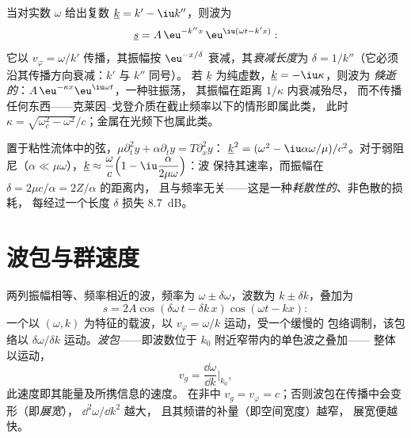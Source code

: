 \begin{definition}\label{def:b2:dispersion-wave-packets:complex}
当对实数 $\omega$ 给出复数
$\underline k = k' - \iu k''$，则波为
\[
\underline s = A\,\eu^{-k''x}\,\eu^{\iu(\omega t - k'x)} :
\]
它以 $v_\varphi = \omega/k'$ 传播，其振幅按
$\eu^{-x/\delta}$ 衰减，其\emph{衰减长度}为 $\delta = 1/k''$（它必须
沿其传播方向衰减：$k'$ 与 $k''$ 同号）。
若 $\underline k$ 为纯虚数，$\underline k = -\iu\kappa$，则波为
\emph{倏逝的}：$A\,\eu^{-\kappa x}\eu^{\iu\omega t}$，一种驻振荡，
其振幅在距离 $1/\kappa$ 内衰减殆尽，
而不传播任何东西——克莱因–戈登介质在截止频率以下的情形即属此类，
此时 $\kappa = \sqrt{\omega_c^2 - \omega^2}/c$；金属在光频下也属此类。
\end{definition}

\begin{example}[阻尼弦]\label{ex:b2:dispersion-wave-packets:damped}
置于粘性流体中的弦，$\mu\partial_t^2y + \alpha\partial_ty = T\partial_x^2y$：
$\underline k^2 = (\omega^2 - \iu\alpha\omega/\mu)/c^2$。对于弱阻尼（$\alpha \ll \mu
\omega$），$\underline k \approx \dfrac\omega c\Bigl(1 - \iu\dfrac{\alpha}{2\mu\omega}\Bigr)$：波
保持其速率，而振幅在 $\delta = 2\mu c/\alpha = 2Z/\alpha$ 的距离内，
且与频率无关——这是一种\emph{耗散性的}、非色散的损耗，
每经过一个长度 $\delta$ 损失 \qty{8.7}{dB}。
\end{example}

\section{波包与群速度}

\begin{proposition}[拍；群速度]\label{prop:b2:dispersion-wave-packets:group}
两列振幅相等、频率相近的波，频率为 $\omega \pm
\delta\omega$，波数为 $k \pm \delta k$，叠加为
\[
s = 2A\cos(\delta\omega\,t - \delta k\,x)\cos(\omega t - kx) :
\]
一个以 $(\omega, k)$ 为特征的载波，以 $v_\varphi = \omega/k$ 运动，受一个缓慢的
包络调制，该包络以 $\delta\omega/\delta k$ 运动。\emph{波包}——即波数位于
$k_0$ 附近窄带内的单色波之叠加——
整体以\emph{}运动，
\[
v_g = \frac{\dd\omega}{\dd k}\Bigr|_{k_0} ,
\]
此速度即其能量及所携信息的速度。
在非中 $v_g = v_\varphi = c$；否则波包在传播中会变形（即\emph{展宽}），
$\dd^2\omega/\dd k^2$ 越大，
且其频谱的补量（即空间宽度）越窄，
展宽便越快。
\end{proposition}

